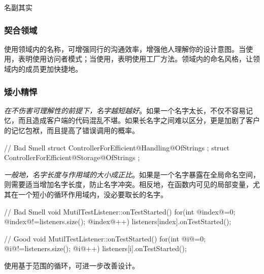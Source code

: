 \begin{content}
\begin{episode}{名副其实}
\begin{content}
\subsubsection{契合领域}

使用领域内的名称，可增强同行的沟通效率，增强他人理解你的设计意图。当使用，表明使用访问者模式；当使用，表明使用工厂方法。领域内的命名风格，让领域内的成员更加快捷地。

\begin{enum}
\end{enum}

\subsubsection{矮小精悍}

\emph{在不伤害可理解性的前提下，名字越短越好}。如果一个名字太长，不仅不容易记忆，而且造成客户端的代码混乱不堪。如果长名字之间难以区分，更是加剧了客户的记忆包袱，而且提高了错误调用的概率。

\begin{c++}[title={\ttfamily{坏味道：冗长，难以区分}}]
// Bad Smell
struct ControllerForEfficient@Handling@OfStrings {};
struct ControllerForEfficient@Storage@OfStrings {};
\end{c++}

\emph{一般地，名字长度与作用域的大小成正比}。如果是一个名字暴露在全局命名空间，则需要适当增加名字长度，防止名字冲突。相反地，在函数内可见的局部变量，尤其在一个短小的循环作用域内，没必要取长的名字。

 \begin{c++}[title={\ttfamily{坏味道：使用index命名循环变量}}]
// Bad Smell
void MutilTestListener::onTestStarted() {
  for(int @index@=0; @index@!=listeners.size(); @index@++) {
    listeners[index].onTestStarted();
  }
}
 \end{c++} 

 \begin{c++}[title={\ttfamily{重构：使用i命名循环变量}}]
// Good
void MutilTestListener::onTestStarted() {
  for(int @i@=0; @i@!=listeners.size(); @i@++) {
    listeners[i].onTestStarted();
  }
}
 \end{c++} 

使用基于范围的循环，可进一步改善设计。


\end{content}
\end{episode}
\end{content}
